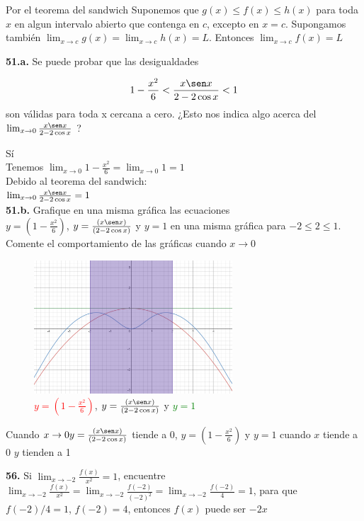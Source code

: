 \documentclass[12pt, letterpaper]{article}
\begin{document}
Por el teorema del sandwich
Suponemos que $g(x) \leq f(x) \leq h(x)$ para toda $x$ en algun intervalo abierto que contenga en $c$, excepto en $x = c$. Supongamos también $\lim_{x \to c} g(x) = \lim_{x \to c} h(x) = L $. Entonces $\lim_{x \to c} f(x)= L$

\textbf{51.a.} Se puede probar que las desigualdades 

\begin{align*}
	1 - \frac{x^2}{6} < \frac{x \sen x}{2-2 \cos x} < 1
\end{align*}
son válidas para toda x cercana a cero. ¿Esto nos indica algo
acerca del
$\lim_{x \to 0} \frac{x \sen x}{2-2 \cos x}$ ?

Sí\\
Tenemos $\lim_{x \to 0} 1 - \frac{x^2}{6} = \lim_{x \to 0} 1 =1$\\ 
Debido al teorema del sandwich:\\
$\lim_{x \to 0} \frac{x \sen x}{2-2 \cos x} = 1$\\


\textbf{51.b.} Grafique en una misma gráfica las ecuaciones\\
$y = (1 - \frac{x^2}{6})$, $y = \frac{(x \sen x)}{(2 - 2 \cos x)}$ y $y = 1$ 
en una misma gráfica para $-2 \leq 2 \leq 1$. Comente el comportamiento de las gráficas cuando $x \to 0$
\begin{figure}[ht]
\centering
\includegraphics[width=20em]{t9dos}
\caption{\textcolor{red}{$y = (1 - \frac{x^2}{6})$}, \textcolor{blue}{$y = \frac{(x \sen x)}{(2 - 2 \cos x)}$} y  \textcolor{green}{$y = 1$ }}	
\end{figure}
Cuando $x \to 0 y = \frac{(x \sen x)}{(2 - 2 \cos x)}$ tiende a 0, $y = (1 - \frac{x^2}{6})$ y $y = 1$ cuando $x$ tiende a 0 $y$ tienden a 1

\textbf{56.} Si $\lim_{x \to -2} \frac{f(x)}{x^2} = 1$, encuentre\\

$\lim_{x \to -2} \frac{f(x)}{x^2} = \lim_{x \to -2} \frac{f(-2)}{(-2)^2} = \lim_{x \to -2} \frac{f(-2)}{4} = 1$, para que $f(-2)/4=1$, $f(-2) = 4$, entonces  $f(x)$ puede ser $-2x$
\end{document}
